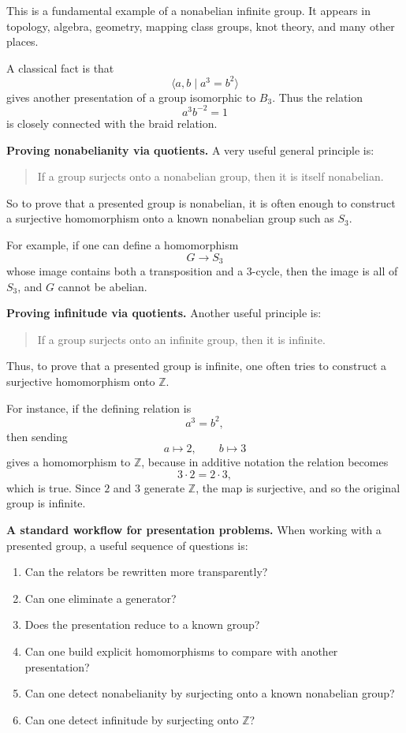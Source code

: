 \documentclass[12pt,a4paper]{article}
\theoremstyle{notespace}
\begin{document}
This is a fundamental example of a nonabelian infinite group. It appears in topology, algebra, geometry, mapping class groups, knot theory, and many other places.

A classical fact is that
\[
\langle a,b\mid a^3=b^2\rangle
\]
gives another presentation of a group isomorphic to \(B_3\). Thus the relation
\[
a^3b^{-2}=1
\]
is closely connected with the braid relation.

\medskip

\textbf{Proving nonabelianity via quotients.}
A very useful general principle is:
\begin{quote}
	If a group surjects onto a nonabelian group, then it is itself nonabelian.
\end{quote}

So to prove that a presented group is nonabelian, it is often enough to construct a surjective homomorphism onto a known nonabelian group such as \(S_3\).

For example, if one can define a homomorphism
\[
G\to S_3
\]
whose image contains both a transposition and a \(3\)-cycle, then the image is all of \(S_3\), and \(G\) cannot be abelian.

\medskip

\textbf{Proving infinitude via quotients.}
Another useful principle is:
\begin{quote}
	If a group surjects onto an infinite group, then it is infinite.
\end{quote}

Thus, to prove that a presented group is infinite, one often tries to construct a surjective homomorphism onto \(\mathbb Z\).

For instance, if the defining relation is
\[
a^3=b^2,
\]
then sending
\[
a\mapsto 2,\qquad b\mapsto 3
\]
gives a homomorphism to \(\mathbb Z\), because in additive notation the relation becomes
\[
3\cdot 2 = 2\cdot 3,
\]
which is true. Since \(2\) and \(3\) generate \(\mathbb Z\), the map is surjective, and so the original group is infinite.

\medskip

\textbf{A standard workflow for presentation problems.}
When working with a presented group, a useful sequence of questions is:

\begin{enumerate}
	\item Can the relators be rewritten more transparently?
	\item Can one eliminate a generator?
	\item Does the presentation reduce to a known group?
	\item Can one build explicit homomorphisms to compare with another presentation?
	\item Can one detect nonabelianity by surjecting onto a known nonabelian group?
	\item Can one detect infinitude by surjecting onto \(\mathbb Z\)?
\end{enumerate}
\end{document}
